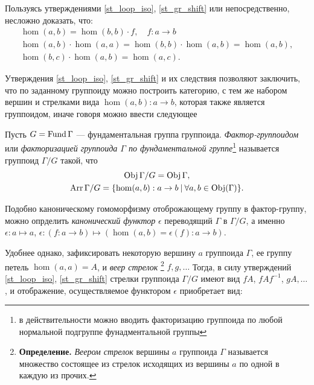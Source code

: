     \begin{corollary}
        Пользуясь утверждениями \ref{st_loop_iso}, \ref{st_gr_shift} или 
        непосредственно, несложно доказать, что:
        \begin{gather*}
            \hom(a,b) = \hom(b,b) \cdot f,\quad f:a\to b\\
            \hom(a,b) \cdot \hom(a,a) = \hom(b,b) \cdot \hom(a,b) = \hom(a,b),\\
            \hom(b,c) \cdot \hom(a,b) = \hom(a,c). 
        \end{gather*}
    \end{corollary}

    \bigskip

    Утверждения \ref{st_loop_iso}, \ref{st_gr_shift} и их следствия позволяют 
    заключить, что по заданному группоиду можно построить категорию, с тем же 
    набором вершин и стрелками вида $\hom(a,b) : a \to b$, которая также 
    является группоидом, иначе говоря можно ввести следующее

    \begin{definition}
        Пусть $G = \operatorname*{Fund} \Gamma$ --- фундаментальная группа группоида. 
        \emph{Фактор-группоидом} или \emph{факторизацией группоида $\Gamma$ по 
        фундаментальной группе}\footnote{в действительности можно вводить 
        факторизацию группоида по любой нормальной подгруппе фунадментальной 
        группы} 
        называется группоид $\Gamma/G$ такой, что 
        \begin{gather*}
            \operatorname*{Obj} \Gamma/G = \operatorname*{Obj} \Gamma,\\
            \operatorname*{Arr} \Gamma/G = \{\hom(a,b) : a \to b \:|\: \forall a,b \in \operatorname*{Obj} (\Gamma)\}.
        \end{gather*}
    \end{definition}

    Подобно каноническому гомоморфизму отоброжающему группу в фактор-группу, 
    можно опрделить \emph{канонический функтор} $\epsilon$ переводящий $\Gamma$ 
    в $\Gamma/G$, а именно $\epsilon : a \mapsto a$, 
    $\epsilon : (f: a \to b) \mapsto (\hom(a,b) = \epsilon(f) : a \to b)$.
    
    \bigskip

    Удобнее однако, зафиксировать некоторую вершину $a$ группоида $\Gamma$, ее 
    группу петель $\hom(a,a) = A$, и \emph{веер стрелок}
    \footnote{\textbf{Определение.} \emph{Веером стрелок} вершины 
    $a$ группоида $\Gamma$ называется множество состоящее из стрелок исходящих 
    из вершины $a$ по одной в каждую из прочих.}
     $f,g,\ldots$ Тогда, в силу утверждений \ref{st_loop_iso}, 
    \ref{st_gr_shift} стрелки группоида $\Gamma /G$ имеют вид $fA$, $fAf^{-1}$, 
    $gA,\ldots$, и отображение, осуществляемое функтором $\epsilon$ приобретает 
    вид:

